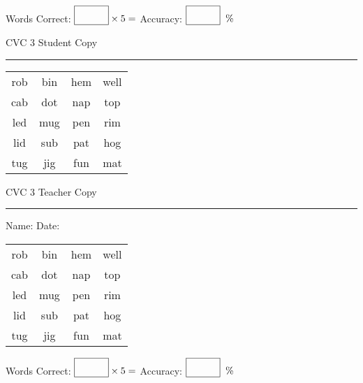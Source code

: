 \documentclass{memoir}
\begin{document}
\small

Words Correct: $\fbox{\phantom{\huge 100}} \times 5 = $ Accuracy: $\fbox{\phantom{\huge 100}}\;\; \%$ 

\vfill

\newpage



\footnotesize \noindent
CVC 3 \hfill Student Copy
\smallskip
\hrule

\Large

\setlength{\tabcolsep}{14pt}
\def\arraystretch{2}

{\selectfont


\begin{vplace}[0.5]
\begin{center}
\begin{tabular}{cccc}
rob & bin & hem & well \\
cab & dot & nap & top \\
led & mug & pen & rim \\
lid & sub & pat & hog \\
tug & jig & fun & mat \\
\end{tabular}
\end{center}
\end{vplace}

}

\newpage

\footnotesize \noindent
CVC 3 \hfill Teacher Copy
\smallskip
\hrule

\small

\vfill

\noindent
Name: \underline{\hspace{1.75in}} \hfill Date: \underline{\hspace{1in}}

\Large

{\selectfont


\begin{vplace}[0.5]
\begin{center}
\begin{tabular}{cccc}
rob & bin & hem & well \\
cab & dot & nap & top \\
led & mug & pen & rim \\
lid & sub & pat & hog \\
tug & jig & fun & mat \\
\end{tabular}
\end{center}
\end{vplace}



}

\small

Words Correct: $\fbox{\phantom{\huge 100}} \times 5 = $ Accuracy: $\fbox{\phantom{\huge 100}}\;\; \%$ 

\vfill

\end{document}
